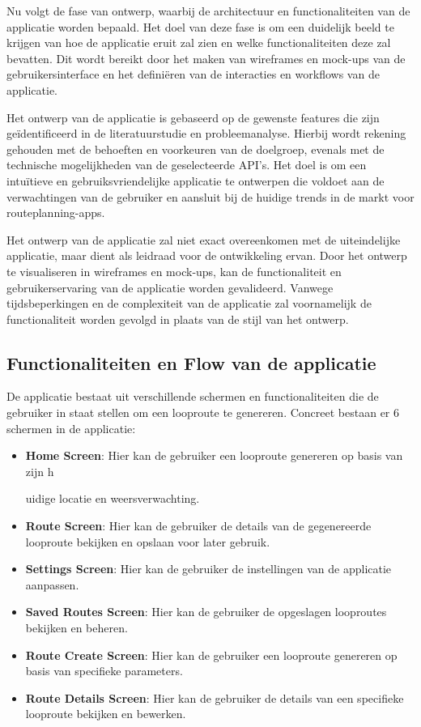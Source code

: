 Nu volgt de fase van ontwerp, waarbij de architectuur en functionaliteiten van de applicatie worden bepaald. Het doel van deze fase is om een duidelijk beeld te krijgen van hoe de applicatie eruit zal zien en welke functionaliteiten deze zal bevatten. Dit wordt bereikt door het maken van wireframes en mock-ups van de gebruikersinterface en het definiëren van de interacties en workflows van de applicatie.

Het ontwerp van de applicatie is gebaseerd op de gewenste features die zijn geïdentificeerd in de literatuurstudie en probleemanalyse. Hierbij wordt rekening gehouden met de behoeften en voorkeuren van de doelgroep, evenals met de technische mogelijkheden van de geselecteerde API's. Het doel is om een intuïtieve en gebruiksvriendelijke applicatie te ontwerpen die voldoet aan de verwachtingen van de gebruiker en aansluit bij de huidige trends in de markt voor routeplanning-apps.

Het ontwerp van de applicatie zal niet exact overeenkomen met de uiteindelijke applicatie, maar dient als leidraad voor de ontwikkeling ervan. Door het ontwerp te visualiseren in wireframes en mock-ups, kan de functionaliteit en gebruikerservaring van de applicatie worden gevalideerd. Vanwege tijdsbeperkingen en de complexiteit van de applicatie zal voornamelijk de functionaliteit worden gevolgd in plaats van de stijl van het ontwerp.

\subsection{Functionaliteiten en Flow van de applicatie}

De applicatie bestaat uit verschillende schermen en functionaliteiten die de gebruiker in staat stellen om een looproute te genereren. Concreet bestaan er 6 schermen in de applicatie:

\begin{itemize}
    \item \textbf{Home Screen}: Hier kan de gebruiker een looproute genereren op basis van zijn h

uidige locatie en weersverwachting.
    \item \textbf{Route Screen}: Hier kan de gebruiker de details van de gegenereerde looproute bekijken en opslaan voor later gebruik.
    \item \textbf{Settings Screen}: Hier kan de gebruiker de instellingen van de applicatie aanpassen.
    \item \textbf{Saved Routes Screen}: Hier kan de gebruiker de opgeslagen looproutes bekijken en beheren.
    \item \textbf{Route Create Screen}: Hier kan de gebruiker een looproute genereren op basis van specifieke parameters.
    \item \textbf{Route Details Screen}: Hier kan de gebruiker de details van een specifieke looproute bekijken en bewerken.
\end{itemize}

